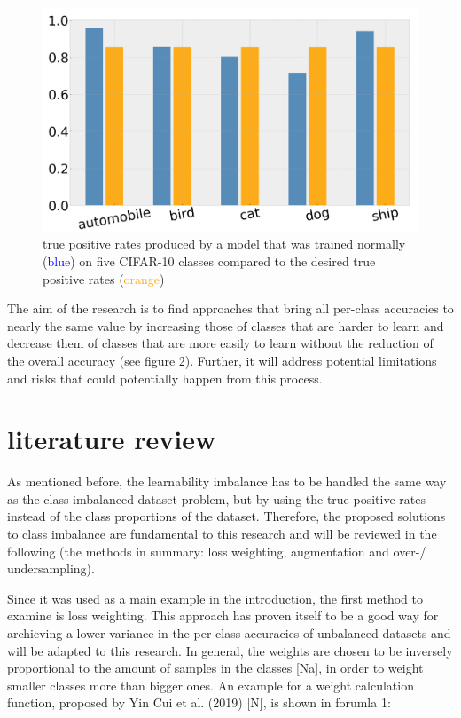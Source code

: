 \documentclass[journal]{IEEEtran}
\begin{document}
\begin{figure}[h!]
        \includegraphics[width=\linewidth]{images/tp_comparison.png}
        \caption{true positive rates produced by a model that was trained normally (\textcolor{blue}{blue}) on five CIFAR-10 classes compared to the desired true positive rates (\textcolor{orange}{orange})}
        \label{fig:tp_comparsion}
\end{figure}

The aim of the research is to find approaches that bring all per-class accuracies to nearly the same value by increasing those of classes that are harder to learn 
and decrease them of classes that are more easily to learn without the reduction of the overall accuracy (see figure 2).
Further, it will address potential limitations and risks that could potentially happen from this process.

\section{literature review}
As mentioned before, the learnability imbalance has to be handled the same way as the class imbalanced dataset problem, but by using the true positive rates instead of the class proportions of the dataset.
Therefore, the proposed solutions to class imbalance are fundamental to this research and will be reviewed in the following (the methods in summary: loss weighting, augmentation and over-/ undersampling).

Since it was used as a main example in the introduction, the first method to examine is loss weighting. 
This approach has proven itself to be a good way for archieving a lower variance in the per-class accuracies of unbalanced datasets and will be adapted to this research. 
In general, the weights are chosen to be inversely proportional to the amount of samples in the classes [Na], in order to weight smaller classes more than bigger ones. 
An example for a weight calculation function, proposed by Yin Cui et al. (2019) [N], is shown in forumla 1:
\end{document}
